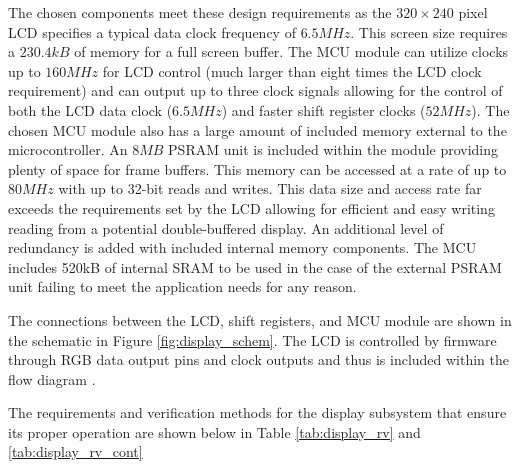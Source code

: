 \documentclass[12pt]{article}
\begin{document}
The chosen components meet these design requirements as the $320\times240$ pixel LCD specifies a typical data clock frequency of $6.5MHz$. This screen size requires a $230.4kB$ of memory for a full screen buffer. The MCU module can utilize clocks up to $160MHz$ for LCD control (much larger than eight times the LCD clock requirement) and can output up to three clock signals allowing for the control of both the LCD data clock ($6.5MHz$) and faster shift register clocks ($52MHz$). The chosen MCU module also has a large amount of included memory external to the microcontroller. An $8MB$ PSRAM unit is included within the module providing plenty of space for frame buffers. This memory can be accessed at a rate of up to $80MHz$ with up to 32-bit reads and writes. This data size and access rate far exceeds the requirements set by the LCD allowing for efficient and easy writing reading from a potential double-buffered display. An additional level of redundancy is added with included internal memory components. The MCU includes 520kB of internal SRAM to be used in the case of the external PSRAM unit failing to meet the application needs for any reason.

The connections between the LCD, shift registers, and MCU module are shown in the schematic in Figure \ref{fig:display_schem}. The LCD is controlled by firmware through RGB data output pins and clock outputs and thus is included within the flow diagram .

The requirements and verification methods for the display subsystem that ensure its proper operation are shown below in Table \ref{tab:display_rv} and \ref{tab:display_rv_cont}
\end{document}
